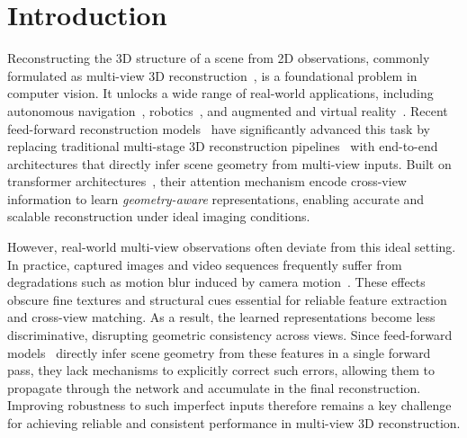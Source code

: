 \section{Introduction}
\label{sec:intro}

Reconstructing the 3D structure of a scene from 2D observations, commonly formulated as multi-view 3D reconstruction~\cite{hartley2003multiple, schonberger2016structure, furukawa2010towards, rosinol2020kimera, cramariuc2022maplab}, is a foundational problem in computer vision. It unlocks a wide range of real-world applications, including autonomous navigation~\cite{ceccarelli2022rgb, vargas2021overview, zhu2024llava}, robotics~\cite{kim2015real, lingbot-depth2026, 9506550}, and augmented and virtual reality~\cite{park2011handling, wloka1996interactive, okumura2006augmented}. Recent feed-forward reconstruction models~\cite{depthanything3, wang2025vggt, wang2025pi, wang2024dust3r, leroy2024grounding} have significantly advanced this task by replacing traditional multi-stage 3D reconstruction pipelines~\cite{hartley2003multiple, schonberger2016structure, 
furukawa2010towards} with end-to-end architectures that directly infer scene geometry from multi-view inputs. Built on transformer architectures~\cite{vaswani2017attention, dosovitskiy2020image}, their attention mechanism encode cross-view information to learn \textit{geometry-aware} representations, enabling accurate and scalable reconstruction under ideal imaging conditions.


However, real-world multi-view observations often deviate from this ideal setting. In practice, captured images and video sequences frequently suffer from degradations such as motion blur induced by camera motion~\cite{nah2017deep, rim2020real, malyugina2025unsupervised, liu2024boosting, han2025emergent}. These effects obscure fine textures and structural cues essential for reliable feature extraction and cross-view matching. As a result, the learned representations become less discriminative, disrupting geometric consistency across views. Since feed-forward models~\cite{depthanything3, wang2025vggt, wang2025pi, wang2024dust3r, leroy2024grounding} directly infer scene geometry from these features in a single forward pass, they lack mechanisms to explicitly correct such errors, allowing them to propagate through the network and accumulate in the final reconstruction. Improving robustness to such imperfect inputs therefore remains a key challenge for achieving reliable and consistent performance in multi-view 3D reconstruction.


